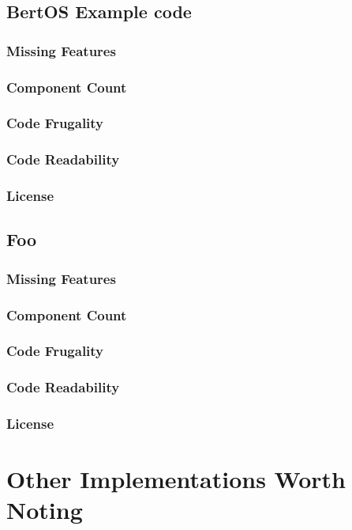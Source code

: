 \documentclass{article}
\begin{document}
\subsection{BertOS Example code}
\subsubsection{Missing Features}
\subsubsection{Component Count}
\subsubsection{Code Frugality}
\subsubsection{Code Readability}
\subsubsection{License}


\subsection{Foo}
\subsubsection{Missing Features}
\subsubsection{Component Count}
\subsubsection{Code Frugality}
\subsubsection{Code Readability}
\subsubsection{License}


\section{Other Implementations Worth Noting}
\end{document}
